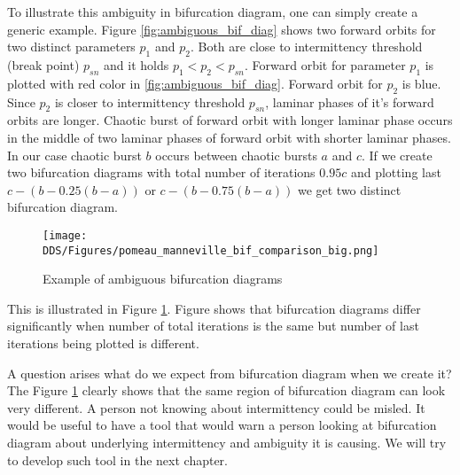 To illustrate this ambiguity in bifurcation diagram, one can simply create a generic example.
Figure \ref{fig:ambiguous_bif_diag} shows two forward orbits for two distinct parameters $p_1$ and $p_2$.
Both are close to intermittency threshold (break point) $p_{sn}$ and it holds $p_1 < p_2 < p_{sn}$.
Forward orbit for parameter $p_1$ is plotted with red color in \ref{fig:ambiguous_bif_diag}.
Forward orbit for $p_2$ is blue.
Since $p_2$ is closer to intermittency threshold $p_{sn}$, laminar phases of it's forward orbits are longer.
Chaotic burst of forward orbit with longer laminar phase occurs in the middle of two laminar phases of forward orbit with shorter laminar phases.
In our case chaotic burst $b$ occurs between chaotic bursts $a$ and $c$.
If we create two bifurcation diagrams with total number of iterations $0.95 c$ and plotting last $c-(b-0.25(b-a))$ or $c-(b-0.75(b-a))$ we get two distinct bifurcation diagram.


\begin{figure}[!h]
    \centering
    \texttt{[image: DDS/Figures/pomeau\_manneville\_bif\_comparison\_big.png]}
    \caption{Example of ambiguous bifurcation diagrams}
    \label{fig:ambiguous_bif_diag_example}
\end{figure}

This is illustrated in Figure \ref{fig:ambiguous_bif_diag_example}.
Figure shows that bifurcation diagrams differ significantly when number of total iterations is the same but number of last iterations being plotted is different.
\par
A question arises what do we expect from bifurcation diagram when we create it?
The Figure \ref{fig:ambiguous_bif_diag_example} clearly shows that the same region of bifurcation diagram can look very different.
A person not knowing about intermittency could be misled.
It would be useful to have a tool that would warn a person looking at bifurcation diagram about underlying intermittency and ambiguity it is causing.
We will try to develop such tool in the next chapter.

\endinput